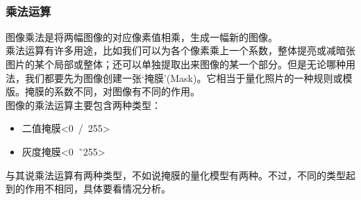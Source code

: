\documentclass[11pt]{article}
\begin{document}
    \begin{center}
    \end{center}
    { \hspace*{\fill} \\}
    
    \begin{center}
    \end{center}
       
        \subsubsection{乘法运算}
		图像乘法是将两幅图像的对应像素值相乘，生成一幅新的图像。\\
		乘法运算有许多用途，比如我们可以为各个像素乘上一个系数，整体提亮或减暗张图片的某个局部或整体；还可以单独提取出来图像的某一个部分。但是无论哪种用法，我们都要先为图像创建一张‘掩膜’(Mask)。它相当于量化照片的一种规则或模版。掩膜的系数不同，对图像有不同的作用。\\
		图像的乘法运算主要包含两种类型：
		\begin{itemize}
			\item 二值掩膜<0\ /\ 255>
			\item 灰度掩膜<0\ \~\ 255>
		\end{itemize}
    与其说乘法运算有两种类型，不如说掩膜的量化模型有两种。不过，不同的类型起到的作用不相同，具体要看情况分析。
    
\end{document}
